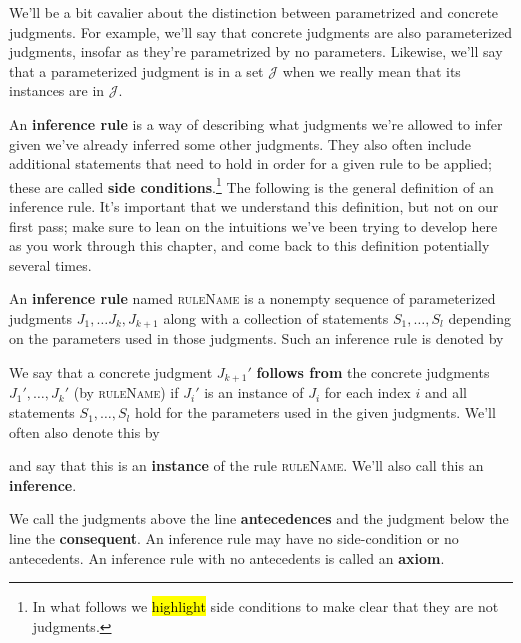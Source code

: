 \begin{remark}
We'll be a bit cavalier about the distinction between parametrized and concrete judgments.
For example, we'll say that concrete judgments are also parameterized judgments, insofar as they're parametrized by no parameters.
Likewise, we'll say that a parameterized judgment is in a set $\mathcal J$ when we really mean that its instances are in $\mathcal J$.
\end{remark}
An \textbf{inference rule} is a way of describing what judgments we're allowed to infer given we've already inferred some other judgments.
They also often include additional statements that need to hold in order for a given rule to be applied; these are called \textbf{side conditions}.\footnote{
In what follows we \hl{highlight} side conditions to make clear that they are not judgments.
}
The following is the general definition of an inference rule.
It's important that we understand this definition, but not on our first pass; make sure to lean on the intuitions we've been trying to develop here as you work through this chapter, and come back to this definition potentially several times.
\begin{definition}
  An \textbf{inference rule} named \textsc{ruleName} is a nonempty sequence of parameterized judgments $J_1, \dots J_k, J_{k + 1}$ along with a collection of statements $S_1, \dots, S_l$ depending on the parameters used in those judgments.
  Such an inference rule is denoted by
  \begin{mathpar}
  \end{mathpar}
  We say that a concrete judgment $J_{k + 1}'$ \textbf{follows from} the concrete judgments $J_1', \dots, J_k'$ (by \textsc{ruleName}) if $J_i'$ is an instance of $J_i$ for each index $i$ and all statements $S_1, \dots, S_l$ hold for the parameters used in the given judgments.
  We'll often also denote this by
  \begin{mathpar}
  \end{mathpar}
  and say that this is an \textbf{instance} of the rule \textsc{ruleName}.
  We'll also call this an \textbf{inference}.
\end{definition}
We call the judgments above the line \textbf{antecedences} and the judgment below the line the \textbf{consequent}.
An inference rule may have no side-condition or no antecedents.
An inference rule with no antecedents is called an \textbf{axiom}.

